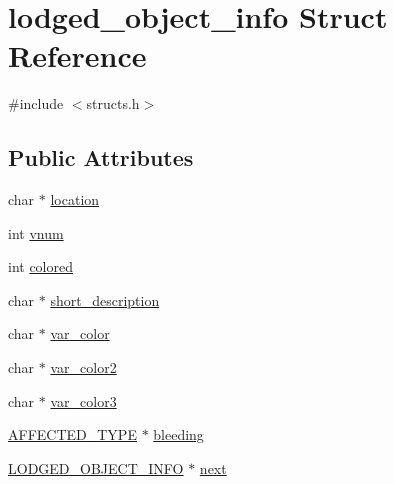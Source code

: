 \hypertarget{structlodged__object__info}{\section{lodged\-\_\-object\-\_\-info Struct Reference}
\label{structlodged__object__info}
}


{\ttfamily \#include $<$structs.\-h$>$}

\subsection*{Public Attributes}
\begin{DoxyCompactItemize}
\item 
char $\ast$ \hyperlink{structlodged__object__info_abe0bd80a8b3f143aa295d14596cc7b4b}{location}
\item 
int \hyperlink{structlodged__object__info_a92eba40298d079eabeba79108fa760c6}{vnum}
\item 
int \hyperlink{structlodged__object__info_a3392e3e8007dce751d2f08b0f8780553}{colored}
\item 
char $\ast$ \hyperlink{structlodged__object__info_aacc602b89467eb3113207959551d867c}{short\-\_\-description}
\item 
char $\ast$ \hyperlink{structlodged__object__info_a500dde882cb024dad05652e6a74b504b}{var\-\_\-color}
\item 
char $\ast$ \hyperlink{structlodged__object__info_af8fad921ce3dd7335ff8c290d8799621}{var\-\_\-color2}
\item 
char $\ast$ \hyperlink{structlodged__object__info_a7202f04109e336635884bf89a8826b60}{var\-\_\-color3}
\item 
\hyperlink{structs_8h_a0a9304fc5764d8448c93fdffdd64e1d2}{A\-F\-F\-E\-C\-T\-E\-D\-\_\-\-T\-Y\-P\-E} $\ast$ \hyperlink{structlodged__object__info_a4cdb34c04d17436b9bfd8551de4b61d8}{bleeding}
\item 
\hyperlink{structs_8h_aa299ea0a69d123edbc3b581b10115e2b}{L\-O\-D\-G\-E\-D\-\_\-\-O\-B\-J\-E\-C\-T\-\_\-\-I\-N\-F\-O} $\ast$ \hyperlink{structlodged__object__info_ab731d64c989dc955e95d2f17219b51bc}{next}
\end{DoxyCompactItemize}


